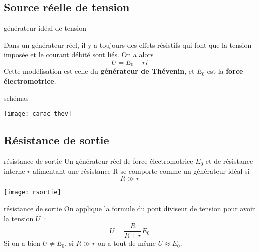 \documentclass[../main/main.tex]{subfiles}
\begin{document}
\vspace{-15pt}
\subsection{Source réelle de tension}
\begin{tcbraster}[raster columns=3, raster equal height=rows]
    \begin{defi}[label=def:gentens, sidebyside, raster multicolumn=2]
        {générateur idéal de tension}

        Dans un générateur réel, il y a toujours des effets résistifs qui font
        que la tension imposée et le courant débité sont liés. On a alors
        \[\boxed{U = E_0 - ri}\]
        \tcblower
        Cette modélisation est celle du \textbf{générateur de Thévenin}, et
        $E_0$ est la \textbf{force électromotrice}.

    \end{defi}
    \begin{exem}[label=exem:gentens, sidebyside, righthand ratio=0.7]{schémas}
        \begin{center}
        \end{center}
        \tcblower
        \begin{center}
            \texttt{[image: carac\_thev]}
        \end{center}
    \end{exem}
\end{tcbraster}

\vspace{-15pt}
\subsection{Résistance de sortie}

\begin{tcbraster}[raster columns=2, raster equal height=rows]
    \begin{prop}[label=prop:rsortie, sidebyside]{résistance de sortie}
        Un générateur réel de force électromotrice $E_0$ et de résistance
        interne $r$ alimentant une résistance R se comporte comme un générateur
        idéal si
        \[ \boxed{R \gg r}\]
        \tcblower
        \begin{center}
            \texttt{[image: rsortie]}
        \end{center}
    \end{prop}
    \begin{demo}[label=demo:rsortie]{résistance de sortie}
        On applique la formule du pont diviseur de tension pour avoir la tension
        $U$~:
        \[ U = \frac{R}{R + r}E_0\]
        Si on a bien $U \neq E_0$, si $R \gg r$ on a tout de même $U \approx
        E_0$.
    \end{demo}
\end{tcbraster}
\end{document}
